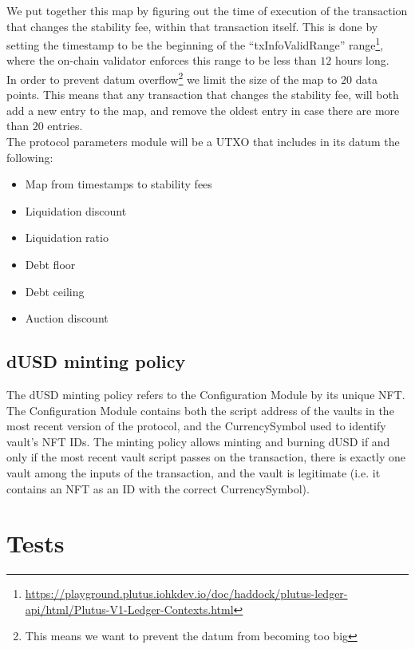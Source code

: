 \documentclass{article} %
\begin{document}
We put together this map by figuring out the time of execution of the
transaction that changes the stability fee, within that transaction itself.
This is done by setting the timestamp to be the beginning of the
``txInfoValidRange'' range\footnote{
  \url{https://playground.plutus.iohkdev.io/doc/haddock/plutus-ledger-api/html/Plutus-V1-Ledger-Contexts.html}},
where the on-chain validator enforces this range to be less than $12$ hours
long. \\

In order to prevent datum overflow\footnote{
  This means we want to prevent the datum from becoming too big}
we limit the size of the map to $20$ data points.
This means that any transaction that changes the stability fee, will both add a
new entry to the map, and remove the oldest entry in case there are more than
$20$ entries. \\

The protocol parameters module will be a UTXO that includes in its datum the following:
\begin{itemize}
  \item Map from timestamps to stability fees
  \item Liquidation discount
  \item Liquidation ratio
  \item Debt floor
  \item Debt ceiling
  \item Auction discount
\end{itemize}

\subsection{dUSD minting policy}

The dUSD minting policy refers to the Configuration Module by its unique NFT.
The Configuration Module contains both the script address of the vaults in the
most recent version of the protocol, and the CurrencySymbol used to identify
vault's NFT IDs. The minting policy allows minting and burning dUSD if and only
if the most recent vault script passes on the transaction, there is exactly one
vault among the inputs of the transaction, and the vault is legitimate (i.e. it
contains an NFT as an ID with the correct CurrencySymbol).

\section{Tests}
\end{document}
